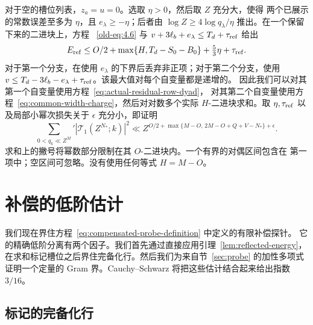 \documentclass[11pt,a4paper]{article}
\numberwithin{equation}{section}
\numberwithin{figure}{section}
\theoremstyle{definition}
\theoremstyle{remark}
\begin{document}
对于空的槽位列表，\(z_a=u=0\)。选取 \(\eta>0\)，然后取 \(Z\) 充分大，使得
两个已展示的常数误差至多为 \(\eta\)，且 \(e_\lambda\ge-\eta\)；后者由
\(\log Z\ge4\log q_\lambda/\eta\) 推出。在一个保留下来的二进块上，方程
~\eqref{old-eq:4.6} 与 \(v+3\ell_b+e_\lambda\le T_d+\tau_{\rm ref}\) 给出
\[
 E_{\rm ref}
 \le O/2+\max\{H,T_d-S_0-B_0\}+\tfrac53\eta+\tau_{\rm ref}.
\]
对于第一个分支，在使用 \(e_\lambda\) 的下界后丢弃非正项；对于第二个分支，使用
\(v\le T_d-3\ell_b-e_\lambda+\tau_{\rm ref}\)。该最大值对每个自变量都是递增的。
因此我们可以对其第一个自变量使用方程~\eqref{eq:actual-residual-row-dyad}，
对其第二个自变量使用方程~\eqref{eq:common-width-charge}，然后对对数多个实际
\(H\)-二进块求和。取 \(\eta,\tau_{\rm ref}\) 以及局部小幂次损失关于
\(\epsilon\) 充分小，即证明
\begin{equation}\label{eq:completed-moment}
 \sum_{0<q_k\ll Z^M}'|\mathcal T_1(Z^{N_*};k)|^2
 \ll Z^{O/2+\max\{M-O,\,2M-O+Q+V-N_*\}+\epsilon}.
\end{equation}
求和上的撇号将幂数部分限制在其 \(O\)-二进块内。一个有界的对偶区间包含在
第一项中；空区间可忽略。没有使用任何等式 \(H=M-O\)。

\section{补偿的低阶估计}\label{sec:compensated-low}

我们现在界住方程~\eqref{eq:compensated-probe-definition} 中定义的有限补偿探针。
它的精确低阶分离有两个因子。我们首先通过直接应用引理~\ref{lem:reflected-energy}，
在求和标记槽位之后界住完备化行。然后我们为来自节~\ref{sec:probe} 的加性多项式
证明一个定量的 Gram 界。Cauchy--Schwarz 将把这些估计结合起来给出指数 $3/16$。

\subsection{标记的完备化行}
\end{document}
